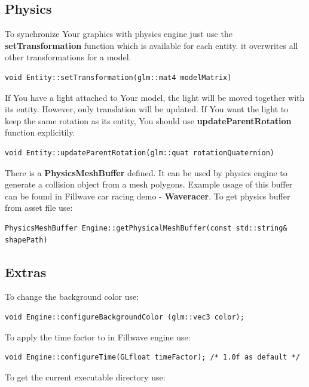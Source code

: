 \documentclass{article}
\begin{document}
\subsection{Physics}\label{sec:Physics}
\indent \indent To synchronize Your graphics with physics engine just use the \textbf{setTransformation} function which is available for each entity. it overwrites all other transformations for a model.

\begin{lstlisting}
void Entity::setTransformation(glm::mat4 modelMatrix)
\end{lstlisting}

\indent \indent If You have a light attached to Your model, the light will be moved together with its entity. However, only translation will be updated. If You want the light to keep the same rotation as its entity, You should use \textbf{updateParentRotation} function explicitily. 

\begin{lstlisting}
void Entity::updateParentRotation(glm::quat rotationQuaternion)
\end{lstlisting}

\indent \indent There is a \textbf{PhysicsMeshBuffer} defined. It can be used by physics engine to generate a collision object from a mesh polygons. Example usage of this buffer can be found in Fillwave car racing demo - \textbf{Waveracer}. To get physics buffer from asset file use:

\begin{lstlisting}
PhysicsMeshBuffer Engine::getPhysicalMeshBuffer(const std::string& shapePath)
\end{lstlisting}

\subsection{Extras}\label{sec:Extras}
\indent To change the background color use:

\begin{lstlisting}
void Engine::configureBackgroundColor (glm::vec3 color);
\end{lstlisting}

\indent To apply the time factor to in Fillwave engine use:

\begin{lstlisting}
void Engine::configureTime(GLfloat timeFactor); /* 1.0f as default */
\end{lstlisting}

\indent To get the current executable directory use:
\end{document}
